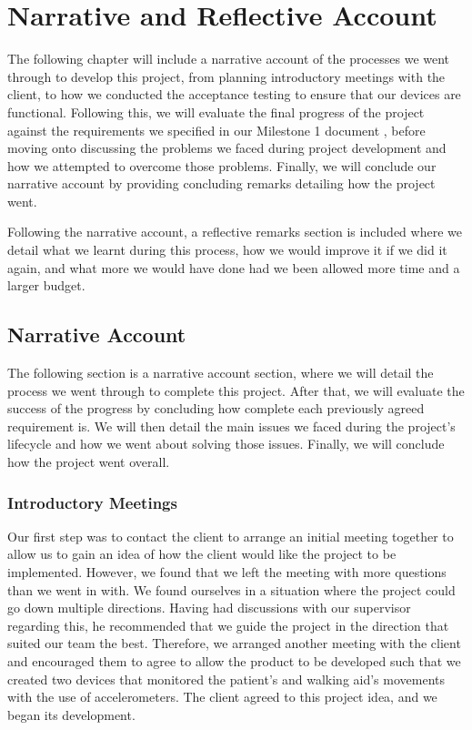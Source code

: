 \chapter{Narrative and Reflective Account}
\label{ch:narrative}

    The following chapter will include a narrative account of the processes we went through to develop this project, from planning introductory meetings with the client, to how we conducted the acceptance testing to ensure that our devices are functional. Following this, we will evaluate the final progress of the project against the requirements we specified in our Milestone 1 document \cite{coaker}, before moving onto discussing the problems we faced during project development and how we attempted to overcome those problems. Finally, we will conclude our narrative account by providing concluding remarks detailing how the project went.

    Following the narrative account, a reflective remarks section is included where we detail what we learnt during this process, how we would improve it if we did it again, and what more we would have done had we been allowed more time and a larger budget.

    \section{Narrative Account}
    \label{sec:narrative_account}

        The following section is a narrative account section, where we will detail the process we went through to complete this project. After that, we will evaluate the success of the progress by concluding how complete each previously agreed requirement is. We will then detail the main issues we faced during the project's lifecycle and how we went about solving those issues. Finally, we will conclude how the project went overall.

        \subsection{Introductory Meetings}

            Our first step was to contact the client to arrange an initial meeting together to allow us to gain an idea of how the client would like the project to be implemented. However, we found that we left the meeting with more questions than we went in with. We found ourselves in a situation where the project could go down multiple directions. Having had discussions with our supervisor regarding this, he recommended that we guide the project in the direction that suited our team the best. Therefore, we arranged another meeting with the client and encouraged them to agree to allow the product to be developed such that we created two devices that monitored the patient's and walking aid's movements with the use of accelerometers. The client agreed to this project idea, and we began its development.

